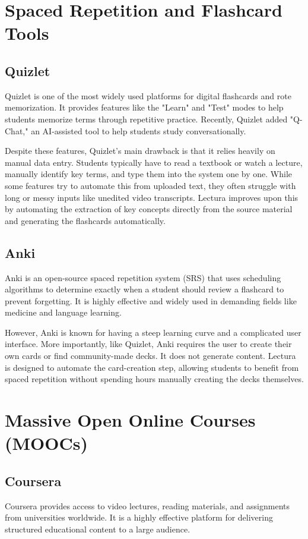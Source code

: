 \section{Spaced Repetition and Flashcard Tools}

\subsection{Quizlet}
Quizlet is one of the most widely used platforms for digital flashcards and rote memorization. It provides features like the "Learn" and "Test" modes to help students memorize terms through repetitive practice. Recently, Quizlet added "Q-Chat," an AI-assisted tool to help students study conversationally.

Despite these features, Quizlet's main drawback is that it relies heavily on manual data entry. Students typically have to read a textbook or watch a lecture, manually identify key terms, and type them into the system one by one. While some features try to automate this from uploaded text, they often struggle with long or messy inputs like unedited video transcripts. Lectura improves upon this by automating the extraction of key concepts directly from the source material and generating the flashcards automatically.

\subsection{Anki}
Anki is an open-source spaced repetition system (SRS) that uses scheduling algorithms to determine exactly when a student should review a flashcard to prevent forgetting. It is highly effective and widely used in demanding fields like medicine and language learning. 

However, Anki is known for having a steep learning curve and a complicated user interface. More importantly, like Quizlet, Anki requires the user to create their own cards or find community-made decks. It does not generate content. Lectura is designed to automate the card-creation step, allowing students to benefit from spaced repetition without spending hours manually creating the decks themselves.

\section{Massive Open Online Courses (MOOCs)}

\subsection{Coursera}
Coursera provides access to video lectures, reading materials, and assignments from universities worldwide. It is a highly effective platform for delivering structured educational content to a large audience.

